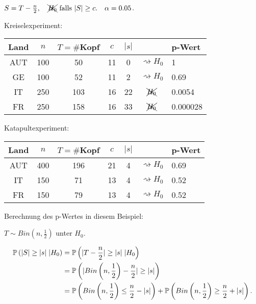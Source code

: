 \documentclass{tstextbook}
\begin{document}
\begin{example}
	$ S=T-\frac{n}{2}, \quad \xcancel{H_0} \text{ falls } |S|\ge c. \quad \alpha = 0.05 $.
	
	Kreiselexperiment:
	\vspace{0.5cm}
\begin{center}	
	\begin{tabular}{c|c|c|c|c|c|l}
		Land 	& $ n $ 	& $ T=\# $Kopf 	& $ c $ 	& $ |s| $ 	& & p-Wert \\
		\midrule
		AUT		& 100		& 50 			& 11		& 0						& $ \rightsquigarrow H_0 $ & 1 \\
		GE		& 100		& 52 			& 11		& 2						& $ \rightsquigarrow H_0 $ & 0.69 \\
		IT		& 250		& 103 			& 16		& 22					& $ \xcancel{H_0} $ & 0.0054 \\
		FR		& 250		& 158 			& 16		& 33					& $ \xcancel{H_0} $ &  0.000028 \\
	\end{tabular}
\end{center}
	\vspace{0.5cm}
	
	Katapultexperiment:
		\vspace{0.5cm}
\begin{center}	
	\begin{tabular}{c|c|c|c|c|c|l}
		Land 	& $ n $ 	& $ T=\# $Kopf 	& $ c $ 	& $ |s| $ 	& & p-Wert \\
		\midrule
		AUT		& 400		& 196 			& 21		& 4					& $ \rightsquigarrow H_0 $ & 0.69 \\
		IT		& 150		& 71 			& 13		& 4					& $ \rightsquigarrow H_0 $ & 0.52 \\
		FR		& 150		& 79 			& 13		& 4					& $ \rightsquigarrow H_0 $ & 0.52 \\
	\end{tabular}
\end{center}
	\vspace{0.5cm}
	
	Berechnung des p-Wertes in diesem Beispiel:
	
	$ T\sim Bin\left(n, \frac{1}{2}\right) $ unter $ H_0 $. 
	
	\[
	\begin{aligned}
		\mathbb P\left(|S|\ge |s| \; |H_0\right) & = \mathbb P\left(|T-\frac{n}{2}|\ge |s| \; |H_0\right) \\
		& = \mathbb P\left(|Bin\left(n, \frac{1}{2}\right)-\frac{n}{2}|\ge|s|\right) \\
		& = \mathbb P\left(Bin\left(n, \frac{1}{2}\right)\le\frac{n}{2}-|s|\right) + \mathbb P\left(Bin\left(n, \frac{1}{2}\right)\ge\frac{n}{2}+|s|\right).
	\end{aligned}
	\]
\end{example}
\end{document}
